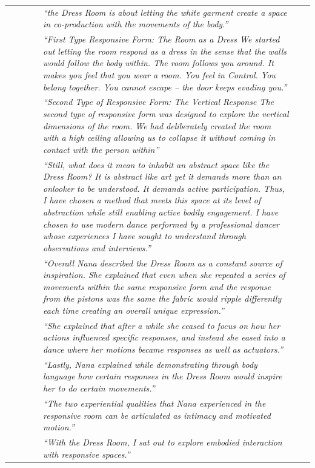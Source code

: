 \begin{landscape}
\begin{table}[p]
\begin{tabularx}{\linewidth}{@{}
    p{.16\linewidth}
    p{.12\linewidth}
    p{.10\linewidth}
    p{.13\linewidth}
    p{.20\linewidth}
    p{.12\linewidth}
    X
  @{}}
        & & & & \emph{``the Dress Room is about letting the white garment create a space in co-production with the movements of the body.''} & & \\
        & & & & \emph{``First Type Responsive Form: The Room as a Dress We started out letting the room respond as a dress in the sense that the walls would follow the body within. The room follows you around. It makes you feel that you wear a room. You feel in Control. You belong together. You cannot escape – the door keeps evading you.''} & & \\
        & & & & \emph{``Second Type of Responsive Form: The Vertical Response The second type of responsive form was designed to explore the vertical dimensions of the room. We had deliberately created the room with a high ceiling allowing us to collapse it without coming in contact with the person within''} & & \\
        & & & & \emph{``Still, what does it mean to inhabit an abstract space like the Dress Room? It is abstract like art yet it demands more than an onlooker to be understood. It demands active participation. Thus, I have chosen a method that meets this space at its level of abstraction while still enabling active bodily engagement. I have chosen to use modern dance performed by a professional dancer whose experiences I have sought to understand through observations and interviews.''} & & \\
        & & & & \emph{``Overall Nana described the Dress Room as a constant source of inspiration.  She explained that even when she repeated a series of movements within the same responsive form and the response from the pistons was the same the fabric would ripple differently each time creating an overall unique expression.''} & & \\
        & & & & \emph{``She explained that after a while she ceased to focus on how her actions influenced specific responses, and instead she eased into a dance where her motions became responses as well as actuators.''} & & \\
        & & & & \emph{``Lastly, Nana explained while demonstrating through body language how certain responses in the Dress Room would inspire her to do certain movements.''} & & \\
        & & & & \emph{``The two experiential qualities that Nana experienced in the responsive room can be articulated as intimacy and motivated motion.''} & & \\
        & & & & \emph{``With the Dress Room, I sat out to explore embodied interaction with responsive spaces.''} & & \\

\end{tabularx}
\end{table}
\end{landscape}
